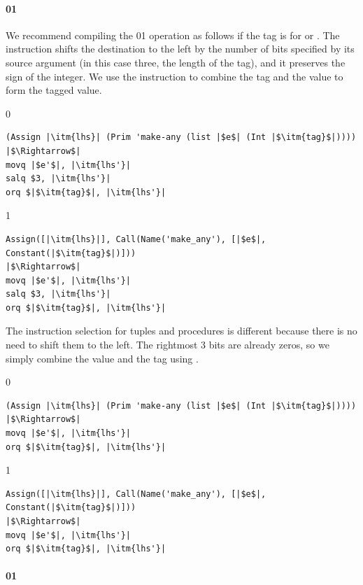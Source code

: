 \documentclass[7x10]{TimesAPriori_MIT}%
\def\racketEd{0}
\def\pythonEd{1}
\providecommand{\BookEdition}{1}
\let\edition\BookEdition
\newcommand{\racket}[1]{{\if\edition\racketEd{#1}\fi}}
\newcommand{\pythonColor}[0]{}
\newcommand{\python}[1]{{\if\edition\pythonEd\pythonColor #1\fi}}
\numberwithin{theorem}{chapter}
\numberwithin{definition}{chapter}
\numberwithin{equation}{chapter}
\begin{document}
\paragraph{\racket{}\python{}}

We recommend compiling the
\racket{}\python{} operation as follows
if the tag is for \INTTY{} or \BOOLTY{}.  The  instruction
shifts the destination to the left by the number of bits specified by its
source argument (in this case three, the length of the tag), and it
preserves the sign of the integer. We use the  instruction to
combine the tag and the value to form the tagged value. 

{\if\edition\racketEd
\begin{lstlisting}
(Assign |\itm{lhs}| (Prim 'make-any (list |$e$| (Int |$\itm{tag}$|))))
|$\Rightarrow$|
movq |$e'$|, |\itm{lhs'}|
salq $3, |\itm{lhs'}|
orq $|$\itm{tag}$|, |\itm{lhs'}|
\end{lstlisting}
\fi}
%
{\if\edition\pythonEd\pythonColor
\begin{lstlisting}
Assign([|\itm{lhs}|], Call(Name('make_any'), [|$e$|, Constant(|$\itm{tag}$|)]))
|$\Rightarrow$|
movq |$e'$|, |\itm{lhs'}|
salq $3, |\itm{lhs'}|
orq $|$\itm{tag}$|, |\itm{lhs'}|
\end{lstlisting}
\fi}
%
The instruction selection for
tuples and procedures is different because there is no need to shift
them to the left. The rightmost 3 bits are already zeros, so we simply
combine the value and the tag using .  \\
%
{\if\edition\racketEd
\begin{center}
\begin{minipage}{\textwidth}
\begin{lstlisting}
(Assign |\itm{lhs}| (Prim 'make-any (list |$e$| (Int |$\itm{tag}$|))))
|$\Rightarrow$|
movq |$e'$|, |\itm{lhs'}|
orq $|$\itm{tag}$|, |\itm{lhs'}|
\end{lstlisting}
\end{minipage}
\end{center}
\fi}
%
{\if\edition\pythonEd\pythonColor
\begin{lstlisting}
Assign([|\itm{lhs}|], Call(Name('make_any'), [|$e$|, Constant(|$\itm{tag}$|)]))
|$\Rightarrow$|
movq |$e'$|, |\itm{lhs'}|
orq $|$\itm{tag}$|, |\itm{lhs'}|
\end{lstlisting}
\fi}

\paragraph{\racket{}\python{}}
\end{document}
